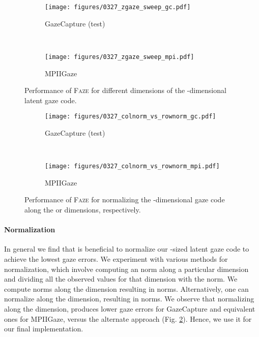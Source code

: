 \documentclass[10pt,twocolumn,letterpaper]{article}
\newcommand{\faze}[0]{\textsc{Faze}\xspace}
\begin{document}
\begin{figure}[]
    \vspace*{3cm}
    \centering
    \begin{subfigure}[b]{\columnwidth}
        \texttt{[image: figures/0327\_zgaze\_sweep\_gc.pdf]}
        \caption{GazeCapture (test)}
    \end{subfigure} \\
    \begin{subfigure}[b]{\columnwidth}
        \texttt{[image: figures/0327\_zgaze\_sweep\_mpi.pdf]}
        \caption{MPIIGaze}
    \end{subfigure}
    \caption{Performance of \faze for different dimensions  of the -dimensional latent gaze code.}
    \label{fig:gaze_code_dim}
    \vspace*{3cm}
\end{figure}

\begin{figure}[]
    \centering
    \begin{subfigure}[b]{\columnwidth}
        \texttt{[image: figures/0327\_colnorm\_vs\_rownorm\_gc.pdf]}
        \caption{GazeCapture (test)}
    \end{subfigure} \\
    \begin{subfigure}[b]{\columnwidth}
        \texttt{[image: figures/0327\_colnorm\_vs\_rownorm\_mpi.pdf]}
        \caption{MPIIGaze}
    \end{subfigure}
    \caption{Performance of \faze for normalizing the -dimensional gaze code along the  or  dimensions, respectively. 
    }
    \label{fig:gaze_code_norm}
\end{figure}


\paragraph{Normalization}

In general we find that is beneficial to normalize our -sized latent gaze code to achieve the lowest gaze errors. We experiment with various methods for normalization, which involve computing an  norm along a particular dimension and dividing all the observed values for that dimension with the norm. We compute norms along the  dimension resulting in  norms. Alternatively, one can normalize along the  dimension, resulting in  norms. We observe that normalizing along the  dimension, produces lower gaze errors for GazeCapture and equivalent ones for MPIIGaze, versus the alternate approach (Fig. \ref{fig:gaze_code_norm}). Hence, we use it for our final implementation. 
\end{document}
